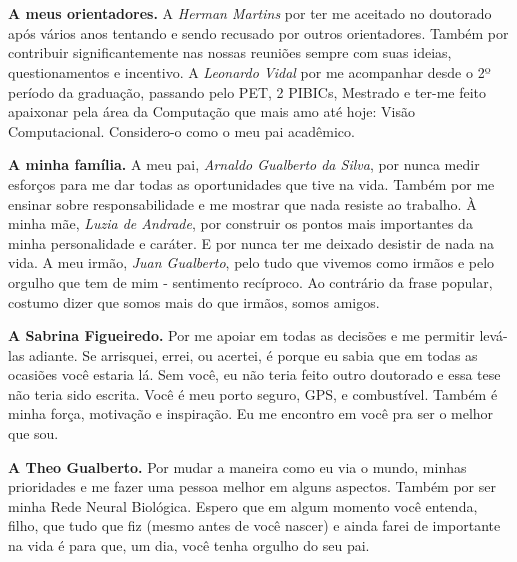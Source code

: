 \section*{}

\textbf{A meus orientadores.} A \textit{Herman Martins} por ter me aceitado no doutorado após vários anos tentando e sendo recusado por outros orientadores. Também por contribuir significantemente nas nossas reuniões sempre com suas ideias, questionamentos e incentivo. A \textit{Leonardo Vidal} por me acompanhar desde o 2º período da graduação, passando pelo PET, 2 PIBICs, Mestrado e ter-me feito apaixonar pela área da Computação que mais amo até hoje: Visão Computacional. Considero-o como o meu pai acadêmico.

\textbf{A minha família.} A meu pai, \textit{Arnaldo Gualberto da Silva}, por nunca medir esforços para me dar todas as oportunidades que tive na vida. Também por me ensinar sobre responsabilidade e me mostrar que nada resiste ao trabalho. À minha mãe, \textit{Luzia de Andrade}, por construir os pontos mais importantes da minha personalidade e caráter. E por nunca ter me deixado desistir de nada na vida. A meu irmão, \textit{Juan Gualberto}, pelo tudo que vivemos como irmãos e pelo orgulho que tem de mim - sentimento recíproco. Ao contrário da frase popular, costumo dizer que somos mais do que irmãos, somos amigos.

\textbf{A Sabrina Figueiredo.} Por me apoiar em todas as decisões e me permitir levá-las adiante. Se arrisquei, errei, ou acertei, é porque eu sabia que em todas as ocasiões você estaria lá. Sem você, eu não teria feito outro doutorado e essa tese não teria sido escrita. Você é meu porto seguro, GPS, e combustível. Também é minha força, motivação e inspiração. Eu me encontro em você pra ser o melhor que sou. 

\textbf{A Theo Gualberto.} Por mudar a maneira como eu via o mundo, minhas prioridades e me fazer uma pessoa melhor em alguns aspectos. Também por ser minha Rede Neural Biológica. Espero que em algum momento você entenda, filho, que tudo que fiz (mesmo antes de você nascer) e ainda farei de importante na vida é para que, um dia, você tenha orgulho do seu pai.

\newpage
{}